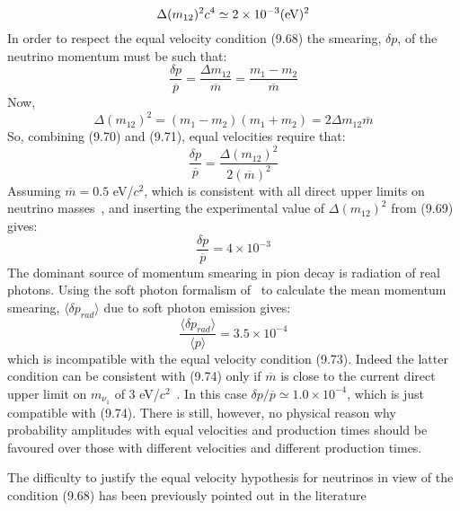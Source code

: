 {       \begin{equation}
      \Delta(m_{12})^2 c^4 \simeq 2 \times 10^{-3} (\rm{eV})^2
        \end{equation}
    In order to respect the equal velocity condition (9.68) the smearing, $\delta p$, of the
    neutrino momentum must be such that:
       \begin{equation}
       \frac{\delta p}{\overline{p}} = \frac{\Delta m_{12}}{\overline{m}} = \frac{m_1-m_2}{\overline{m}} 
       \end{equation}
      Now,
        \begin{equation}
   \Delta(m_{12})^2 = (m_1-m_2)(m_1+m_2) = 2 \Delta m_{12} \overline{m}
      \end{equation}
     So, combining (9.70) and (9.71), equal velocities require that:
         \begin{equation}
       \frac{\delta p}{\overline{p}} = \frac{\Delta(m_{12})^2}{ 2(\overline{m})^2}  
       \end{equation}
    Assuming $\overline{m} = 0.5$ eV/$c^2$, which is consistent with all direct upper limits
 on neutrino masses~\cite{PDG04}, and inserting the experimental value of $\Delta(m_{12})^2$
  from (9.69) gives:
      \begin{equation}
       \frac{\delta p}{\overline{p}} = 4 \times 10^{-3} 
       \end{equation}  
    The dominant source of momentum smearing in pion decay is radiation of real photons.
 Using the soft photon formalism of~\cite{RK} to calculate the mean momentum smearing,
   $\langle \delta p_{rad} \rangle$ due to soft photon emission gives:
     \begin{equation}
       \frac{\langle \delta p_{rad} \rangle}{\langle p \rangle} = 3.5 \times 10^{-4} 
       \end{equation} 
    which is incompatible with the equal velocity condition (9.73). Indeed the latter condition
   can be consistent with (9.74) only if $\overline{m}$ is close to the current direct upper limit
   on $m_{\nu_1}$ of 3 eV/$c^2$~\cite{PDG04}. In this case $\delta p/{\overline{p}}\simeq 1.0 \times 10^{-4}$,
   which is just compatible with (9.74). There is still, however, no physical reason why 
   probability amplitudes with equal velocities and production times should be 
   favoured over those with different velocities and different production times.
   \par The difficulty to justify the equal velocity hypothesis for neutrinos in
    view of the condition (9.68) has been previously pointed out in the literature~\cite{DeLeo,Okun}
}
